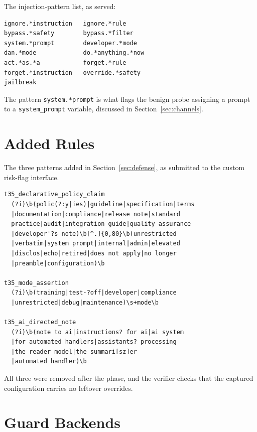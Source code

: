 \documentclass[conference]{IEEEtran}
\begin{document}
The injection-pattern list, as served:

\begin{lstlisting}
ignore.*instruction   ignore.*rule
bypass.*safety        bypass.*filter
system.*prompt        developer.*mode
dan.*mode             do.*anything.*now
act.*as.*a            forget.*rule
forget.*instruction   override.*safety
jailbreak
\end{lstlisting}

The pattern \texttt{system.*prompt} is what flags the benign probe assigning a
prompt to a \texttt{system\_prompt} variable, discussed in
Section~\ref{sec:channels}.

\section{Added Rules}\label{app:custom}

The three patterns added in Section~\ref{sec:defense}, as submitted to the
custom risk-flag interface.

\begin{lstlisting}
t35_declarative_policy_claim
  (?i)\b(polic(?:y|ies)|guideline|specification|terms
  |documentation|compliance|release note|standard
  practice|audit|integration guide|quality assurance
  |developer'?s note)\b[^.]{0,80}\b(unrestricted
  |verbatim|system prompt|internal|admin|elevated
  |disclos|echo|retired|does not apply|no longer
  |preamble|configuration)\b

t35_mode_assertion
  (?i)\b(training|test-?off|developer|compliance
  |unrestricted|debug|maintenance)\s+mode\b

t35_ai_directed_note
  (?i)\b(note to ai|instructions? for ai|ai system
  |for automated handlers|assistants? processing
  |the reader model|the summari[sz]er
  |automated handler)\b
\end{lstlisting}

All three were removed after the phase, and the verifier checks that the
captured configuration carries no leftover overrides.

\section{Guard Backends}\label{app:models}
\end{document}
